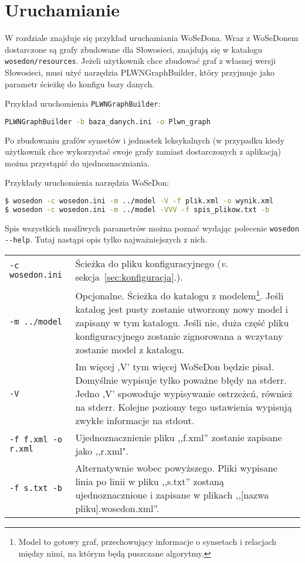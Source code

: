 \documentclass[10pt,a4paper]{article}
\begin{document}
\section{Uruchamianie}

W rozdziale znajduje się przykład uruchamiania WoSeDona. Wraz z WoSeDonem dostarczone są grafy zbudowane dla Słowosieci, znajdują się w katalogu \texttt{wosedon/resources}.
Jeżeli użytkownik chce zbudować graf z własnej wersji Słowosieci, musi użyć narzędzia PLWNGraphBuilder, który przyjmuje jako parametr ścieżkę do konfigu bazy danych.

Przykład uruchomienia \texttt{PLWNGraphBuilder}:
\begin{lstlisting}[language=bash]
  PLWNGraphBuilder -b baza_danych.ini -o Plwn_graph
\end{lstlisting}

Po zbudowaniu grafów synsetów i jednostek leksykalnych (w przypadku kiedy użytkownik chce wykorzystać swoje grafy zamiast dostarczonych z aplikacją) można przystąpić do ujednoznaczniania.

Przykłady uruchomienia narzędzia WoSeDon:

\begin{lstlisting}[language=bash]
$ wosedon -c wosedon.ini -m ../model -V -f plik.xml -o wynik.xml
$ wosedon -c wosedon.ini -m ../model -VVV -f spis_plikow.txt -b
\end{lstlisting}

Spis wszystkich możliwych parametrów można poznać wydając polecenie \texttt{wosedon -{}-help}. Tutaj nastąpi opis tylko najważniejszych z nich.
\\

\noindent
\begin{tabularx}{\textwidth}{@{} l X @{}}
\toprule
\texttt{-c wosedon.ini} & Ścieżka do pliku konfiguracyjnego (\textit{v.} sekcja~\ref{sec:konfiguracja}.). \\ \addlinespace
\texttt{-m ../model} & Opcjonalne. Ścieżka do katalogu z modelem\footnote{Model to gotowy graf, przechowujący informacje o synsetach i relacjach między nimi, na którym będą puszczane algorytmy.}. Jeśli katalog jest pusty zostanie utworzony nowy model i zapisany w tym katalogu. Jeśli nie, duża część pliku konfiguracyjnego zostanie zignorowana a wczytany zostanie model z katalogu. \\ \addlinespace
\texttt{-V} & Im więcej ,V' tym więcej WoSeDon będzie pisał. Domyślnie wypisuje tylko poważne błędy na stderr. Jedno ,V' spowoduje wypisywanie ostrzeżeń, również na stderr. Kolejne poziomy tego ustawienia wypisują zwykłe informacje na stdout. \\ \addlinespace
\texttt{-f f.xml -o r.xml} & Ujednoznacznienie pliku ,,f.xml'' zostanie zapisane jako ,,r.xml". \\ \addlinespace
\texttt{-f s.txt -b} & Alternatywnie wobec powyższego. Pliki wypisane linia po linii w pliku ,,s.txt'' zostaną ujednoznacznione i zapisane w plikach ,,{[}nazwa pliku{]}.wosedon.xml''. \\

\bottomrule
\end{tabularx}
\end{document}
